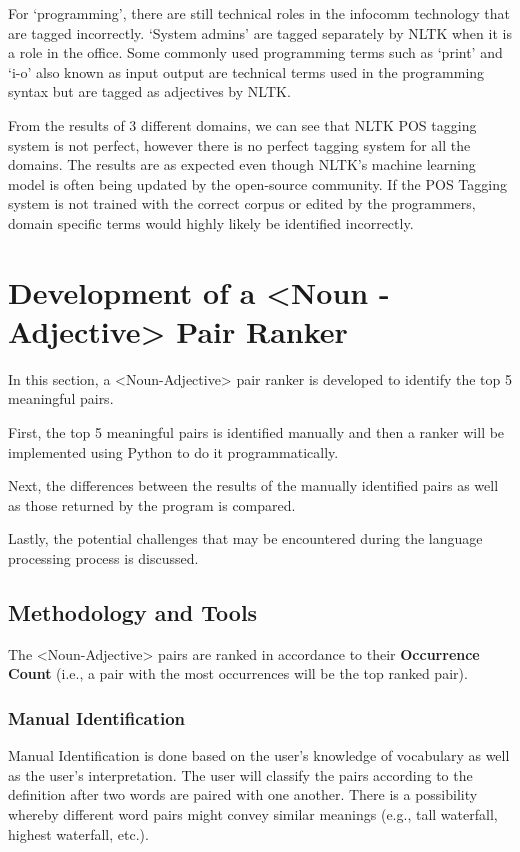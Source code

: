 \documentclass[sigconf,nonacm=true]{acmart}
\begin{document}
For ‘programming’, there are still technical roles in the infocomm technology that are tagged incorrectly. ‘System admins’ are tagged separately by NLTK when it is a role in the office. Some commonly used programming terms such as ‘print’ and ‘i-o’ also known as input output are technical terms used in the programming syntax but are tagged as adjectives by NLTK.

From the results of 3 different domains, we can see that NLTK POS tagging system is not perfect, however there is no perfect tagging system for all the domains. The results are as expected even though NLTK’s machine learning model is often being updated by the open-source community. If the POS Tagging system is not trained with the correct corpus or edited by the programmers, domain specific terms would highly likely be identified incorrectly.

\section{Development of a <Noun - Adjective> Pair Ranker}
In this section, a <Noun-Adjective> pair ranker is developed to identify the top 5 meaningful pairs. 

First, the top 5 meaningful pairs is identified manually and then a ranker will be implemented using Python to do it programmatically. 

Next, the differences between the results of the manually identified pairs as well as those returned by the program is compared. 

Lastly, the potential challenges that may be encountered during the language processing process is discussed.

\subsection{Methodology and Tools}
The <Noun-Adjective> pairs are ranked in accordance to their \textbf{Occurrence Count} (i.e., a pair with the most occurrences will be the top ranked pair).

\subsubsection{Manual Identification}
Manual Identification is done based on the user's knowledge of vocabulary as well as the user's interpretation. The user will classify the pairs according to the definition after two words are paired with one another. There is a possibility whereby different word pairs might convey similar meanings (e.g., tall waterfall, highest waterfall, etc.).
\end{document}

